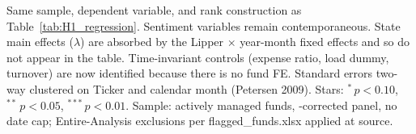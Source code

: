\begin{table}[!htbp]
\begin{minipage}{\tabletempwidth}
  \resizebox{\linewidth}{!}{\usebox{\tabletempbox}}
\else
  \usebox{\tabletempbox}
\fi
\par\medskip
\begin{singlespace}\tablefont\noindent
Same sample, dependent variable, and rank construction as Table~\ref{tab:H1_regression}. Sentiment variables remain contemporaneous. State main effects ($\lambda$) are absorbed by the Lipper $\times$ year-month fixed effects and so do not appear in the table. Time-invariant controls (expense ratio, load dummy, turnover) are now identified because there is no fund FE. Standard errors two-way clustered on Ticker and calendar month (Petersen 2009). Stars: $^{*}\,p<0.10$, $^{**}\,p<0.05$, $^{***}\,p<0.01$. Sample: actively managed funds, \textcite{Evans2010}-corrected panel, no date cap; Entire-Analysis exclusions per flagged\_funds.xlsx applied at source.
\end{singlespace}
\end{minipage}
\end{table}

